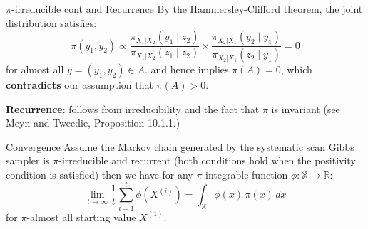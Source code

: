 \begin{frame}{$\pi$-irreducible cont and Recurrence}
	By the Hammersley-Clifford theorem, the joint distribution satisfies:
	\begin{equation*}
		\pi(y_1, y_2) \propto \frac{\pi_{X_1|X_2}(y_1 \mid z_2)}{\pi_{X_1|X_2}(z_1 \mid z_2)} \times \frac{\pi_{X_2|X_1}(y_2 \mid y_1)}{\pi_{X_2|X_1}(z_2 \mid y_1)} = 0
	\end{equation*}
	for almost all $y = (y_1, y_2) \in A$.
	and hence implies $\pi(A) = 0$, which \textbf{contradicts} our assumption that $\pi(A) > 0$.

	\vspace{0.5cm}
	\textbf{Recurrence}: follows from irreducibility and the fact that $\pi$ is
	invariant (see Meyn and Tweedie, Proposition 10.1.1.)
\end{frame}

\begin{frame}{Convergence}
	Assume the Markov chain generated by the systematic scan Gibbs sampler is $\pi$-irreducible 
	and recurrent (both conditions hold when the positivity condition is satisfied) then we 
	have for any $\pi$-integrable function $\phi : \mathbb{X} \to \mathbb{R}$:
	\begin{equation*}
		\lim_{t \to \infty} \frac{1}{t} \sum_{i=1}^{t} \phi\left(X^{(i)}\right) = \int_{\mathbb{X}} \phi(x) \, \pi(x) \, dx
	\end{equation*}
	for $\pi$-almost all starting value $X^{(1)}$.
\end{frame}